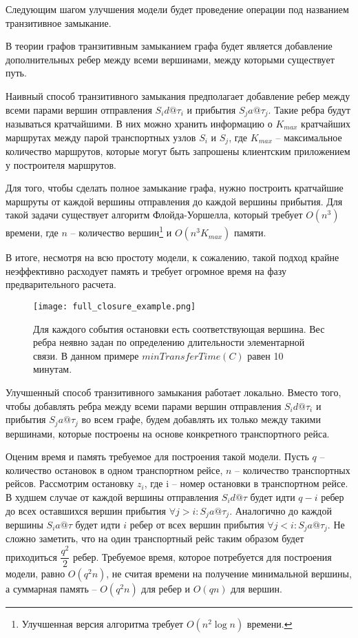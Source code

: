 Следующим шагом улучшения модели будет проведение операции под названием транзитивное замыкание.

\begin{definition}
	В теории графов транзитивным замыканием графа будет является добавление дополнительных ребер между всеми вершинами, между которыми существует путь.
\end{definition}

Наивный способ транзитивного замыкания предполагает добавление ребер между всеми парами вершин отправления $S_id@\tau_i$ и прибытия $S_ja@\tau_j$. Такие ребра будут называться кратчайшими. В них можно хранить информацию о $K_{max}$ кратчайших маршрутах между парой транспортных узлов $S_i$ и $S_j$, где $K_{max}$ -- максимальное количество маршрутов, которые могут быть запрошены клиентским приложением у построителя маршрутов. 

Для того, чтобы сделать полное замыкание графа, нужно построить кратчайшие маршруты от каждой вершины отправления до каждой вершины прибытия. Для такой задачи существует алгоритм Флойда-Уоршелла, который требует $O(n^3)$ времени, где $n$ -- количество вершин\footnote{Улучшенная версия алгоритма требует $O(n^2\log n)$ времени.} и $O(n^3K_{max})$ памяти.

В итоге, несмотря на всю простоту модели, к сожалению, такой подход крайне неэффективно расходует память и требует огромное время на фазу предварительного расчета. 

\begin{figure}[!h]
	\centering
	\texttt{[image: full\_closure\_example.png]}
	\caption{Для каждого события остановки есть соответствующая вершина. Вес ребра неявно задан по определению длительности элементарной связи. В данном примере $minTransferTime(C)$ равен 10 минутам.}\label{fig4}
\end{figure}

Улучшенный способ транзитивного замыкания работает локально. Вместо того, чтобы добавлять ребра между всеми парами вершин отправления $S_id@\tau_i$ и прибытия $S_ja@\tau_j$ во всем графе, будем добавлять их только между такими вершинами, которые построены на основе конкретного транспортного рейса.

Оценим время и память требуемое для построения такой модели. Пусть $q$ -- количество остановок в одном транспортном рейсе, $n$ -- количество транспортных рейсов. Рассмотрим остановку $z_i$, где i -- номер остановки в транспортном рейсе. В худшем случае от каждой вершины отправления $S_id@\tau$ будет идти $q-i$ ребер до всех оставшихся вершин прибытия $\forall j > i : S_ja@\tau_j$. Аналогично до каждой вершины $S_ia@\tau$ будет идти $i$ ребер от всех вершин прибытия $\forall j < i : S_ja@\tau_j$. Не сложно заметить, что на один транспортный рейс таким образом будет приходиться $\dfrac{q^2}{2}$ ребер. Требуемое время, которое потребуется для построения модели, равно $O(q^2n)$, не считая времени на получение минимальной вершины, а суммарная память -- $O(q^2n)$ для ребер и $O(qn)$ для вершин.


